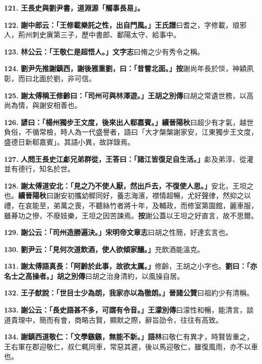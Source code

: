 \textbf{121.} \textbf{王長史與劉尹書，道淵源「觸事長易」。}

\textbf{122.} \textbf{謝中郎云：「王修載樂託之性，出自門風。」}{\footnotesize \textbf{王氏譜}曰耆之，字修載，琅邪人，荊州刺史廙第三子，歷中書郎、鄱陽太守、給事中。}

\textbf{123.} \textbf{林公云：「王敬仁是超悟人。」}{\footnotesize \textbf{文字志}曰脩之少有秀令之稱。}

\textbf{124.} \textbf{劉尹先推謝鎮西，謝後雅重劉，曰：「昔嘗北面。」}{\footnotesize \textbf{按}謝尚年長於惔，神穎夙彰，而曰北面於劉，非可信。}

\textbf{125.} \textbf{謝太傅稱王修齡曰：「司州可與林澤遊。」}{\footnotesize \textbf{王胡之別傳}曰胡之常遺世務，以高尚為情，與謝安相善也。}

\textbf{126.} \textbf{諺曰：「楊州獨步王文度，後來出人郗嘉賓。」}{\footnotesize \textbf{續晉陽秋}曰超少有才氣，越世負俗，不循常檢，時人為一代盛譽者，語曰「大才槃槃謝家安，江東獨步王文度，盛德日新郗嘉賓」。其語小異，故詳錄焉。}

\textbf{127.} \textbf{人問王長史江虨兄弟群從，王答曰：「諸江皆復足自生活。」}{\footnotesize 虨及弟淳、從灌並有德行，知名於世。}

\textbf{128.} \textbf{謝太傅道安北：「見之乃不使人厭，然出戶去，不復使人思。」}{\footnotesize 安北，王坦之也。\textbf{續晉陽秋}曰謝安初攜幼穉同好，養志海濱，襟情超暢，尤好聲律，然抑之以禮，在哀能至，弟萬之喪，不聽絲竹者將十年，及輔政，而修室第園館，麗車服，雖朞功之慘，不廢妓樂，王坦之因苦諫焉。\textbf{按}謝公蓋以王坦之好直言，故不思爾。}

\textbf{129.} \textbf{謝公云：「司州造勝遍決。」}{\footnotesize \textbf{宋明帝文章志}曰胡之性簡，好達玄言也。}

\textbf{130.} \textbf{劉尹云：「見何次道飲酒，使人欲傾家釀。」}{\footnotesize 充飲酒能溫克。}

\textbf{131.} \textbf{謝太傅語真長：「阿齡於此事，故欲太厲。」}{\footnotesize 修齡，王胡之小字也。}\textbf{劉曰：「亦名士之高操者。」}{\footnotesize \textbf{胡之別傳}曰胡之治身清約，以風操自居。}

\textbf{132.} \textbf{王子猷說：「世目士少為朗，我家亦以為徹朗。」}{\footnotesize \textbf{晉諸公贊}曰祖約少有清稱。}

\textbf{133.} \textbf{謝公云：「長史語甚不多，可謂有令音。」}{\footnotesize \textbf{王濛別傳}曰濛性和暢，能清言，談道貴理中，簡而有會，商略古賢，顯默之際，辭旨劭令，往往有高致。}

\textbf{134.} \textbf{謝鎮西道敬仁：「文學鏃鏃，無能不新。」}{\footnotesize \textbf{語林}曰敬仁有異才，時賢皆重之，王右軍在郡迎敬仁，叔仁輒同車，常惡其遲，後以馬迎敬仁，雖復風雨，亦不以車也。}

